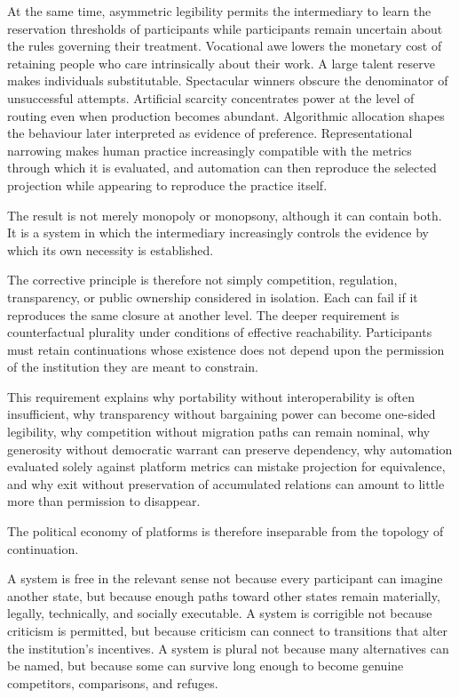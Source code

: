 \documentclass[11pt]{article}
\begin{document}
At the same time, asymmetric legibility permits the intermediary to learn the reservation thresholds of participants while participants remain uncertain about the rules governing their treatment. Vocational awe lowers the monetary cost of retaining people who care intrinsically about their work. A large talent reserve makes individuals substitutable. Spectacular winners obscure the denominator of unsuccessful attempts. Artificial scarcity concentrates power at the level of routing even when production becomes abundant. Algorithmic allocation shapes the behaviour later interpreted as evidence of preference. Representational narrowing makes human practice increasingly compatible with the metrics through which it is evaluated, and automation can then reproduce the selected projection while appearing to reproduce the practice itself.

The result is not merely monopoly or monopsony, although it can contain both. It is a system in which the intermediary increasingly controls the evidence by which its own necessity is established.

The corrective principle is therefore not simply competition, regulation, transparency, or public ownership considered in isolation. Each can fail if it reproduces the same closure at another level. The deeper requirement is counterfactual plurality under conditions of effective reachability. Participants must retain continuations whose existence does not depend upon the permission of the institution they are meant to constrain.

This requirement explains why portability without interoperability is often insufficient, why transparency without bargaining power can become one-sided legibility, why competition without migration paths can remain nominal, why generosity without democratic warrant can preserve dependency, why automation evaluated solely against platform metrics can mistake projection for equivalence, and why exit without preservation of accumulated relations can amount to little more than permission to disappear.

The political economy of platforms is therefore inseparable from the topology of continuation.

A system is free in the relevant sense not because every participant can imagine another state, but because enough paths toward other states remain materially, legally, technically, and socially executable. A system is corrigible not because criticism is permitted, but because criticism can connect to transitions that alter the institution's incentives. A system is plural not because many alternatives can be named, but because some can survive long enough to become genuine competitors, comparisons, and refuges.
\end{document}
